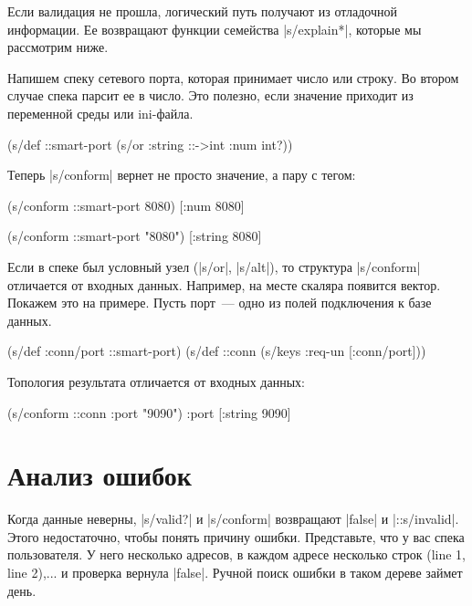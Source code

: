 Если валидация не прошла, логический путь получают из отладочной информации. Ее
возвращают функции семейства \spverb|s/explain*|, которые мы рассмотрим ниже.

Напишем спеку сетевого порта, которая принимает число или строку. Во втором
случае спека парсит ее в число. Это полезно, если значение приходит из
переменной среды или ini-файла.

\begin{english}
  \begin{clojure}
(s/def ::smart-port
  (s/or :string ::->int :num int?))
  \end{clojure}
\end{english}

Теперь \spverb|s/conform| вернет не просто значение, а пару с тегом:

\begin{english}
  \begin{clojure}
(s/conform ::smart-port 8080)
[:num 8080]

(s/conform ::smart-port "8080")
[:string 8080]
  \end{clojure}
\end{english}

Если в спеке был условный узел (\spverb|s/or|, \spverb|s/alt|), то структура
\spverb|s/conform| отличается от входных данных. Например, на месте скаляра
появится вектор. Покажем это на примере. Пусть порт~--- одно из полей
подключения к базе данных.

\begin{english}
  \begin{clojure}
(s/def :conn/port ::smart-port)
(s/def ::conn
  (s/keys :req-un [:conn/port]))
  \end{clojure}
\end{english}

Топология результата отличается от входных данных:

\begin{english}
  \begin{clojure}
(s/conform ::conn {:port "9090"})
{:port [:string 9090]}
  \end{clojure}
\end{english}

\section{Анализ ошибок}

Когда данные неверны, \spverb|s/valid?| и \spverb|s/conform| возвращают
\spverb|false| и \spverb|::s/invalid|. Этого недостаточно, чтобы понять причину
ошибки. Представьте, что у вас спека пользователя. У него несколько адресов, в
каждом адресе несколько строк (line 1, line 2),... и проверка вернула \spverb|false|.
Ручной поиск ошибки в таком дереве займет день.

